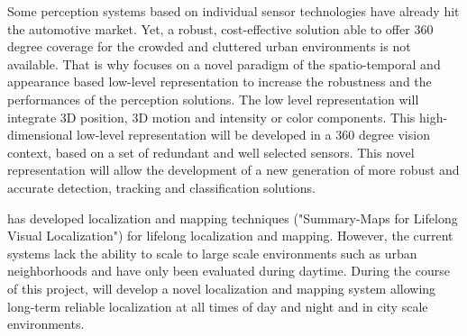 

Some perception systems based on individual sensor technologies have already hit the automotive market. Yet, a robust, cost-effective solution able to offer 360 degree coverage for the crowded and cluttered urban environments is not available. That is why \CLUJ{} focuses on a novel paradigm of the spatio-temporal and appearance based low-level representation to increase the robustness and the performances of the perception solutions. The low level representation will integrate 3D position, 3D motion and intensity or color components. This high-dimensional low-level representation will be developed in a 360 degree vision context, based on a set of redundant and well selected sensors. This novel representation will allow the development of a new generation of more robust and accurate detection, tracking and classification solutions. 



\ETHZ has developed localization and mapping techniques ("Summary-Maps for Lifelong Visual Localization") for lifelong localization and mapping. However, the current systems lack the ability to scale to large scale environments such as urban neighborhoods and have only been evaluated during daytime. During the course of this project, \ETHZ will develop a novel localization and mapping system allowing long-term reliable localization at all times of day and night and in city scale environments.


